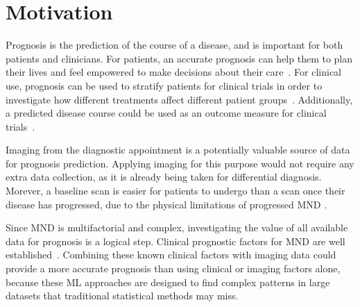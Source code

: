 \section{Motivation}


Prognosis is the prediction of the course of a disease, and is important for both patients and clinicians.
For patients, an accurate prognosis can help them to plan their lives and feel empowered to make decisions about their care~\cite{talbotClinicalToolPredicting2016, vaneenennaamDiscussingPersonalizedPrognosis2021}.
For clinical use, prognosis can be used to stratify patients for clinical trials in order to investigate how different treatments affect different patient groups~\cite{berryImprovedStratificationALS2018}.
Additionally, a predicted disease course could be used as an outcome measure for clinical trials~\cite{kiernanImprovingClinicalTrial2021}.

Imaging from the diagnostic appointment is a potentially valuable source of data for prognosis prediction.
Applying imaging for this purpose would not require any extra data collection, as it is already being taken for differential diagnosis.
Morever, a baseline scan is easier for patients to undergo than a scan once their disease has progressed, due to the physical limitations of progressed MND .

Since MND is multifactorial and complex, investigating the value of all available data for prognosis is a logical step.
Clinical prognostic factors for MND are well established~\cite{suPredictorsSurvivalPatients2021}.
Combining these known clinical factors with imaging data could provide a more accurate prognosis than using clinical or imaging factors alone, because these ML approaches are designed to find complex patterns in large datasets that traditional statistical methods may miss.


